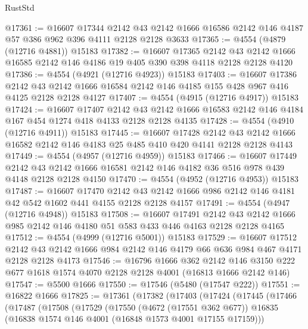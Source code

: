 \begin{lexlean}{RustStd}
\begin{coremodule}
@17361 := @16607
    @17344
    @2142
    @43
    @2142
    @1666
    @16586
    @2142
    @146
    @4187
    @57
    @386
    @962
    @396
    @4111
    @2128
    @2128
    @3633
@17365 := @4554 (@4879 (@12716 @4881)) @15183
@17382 := @16607
    @17365
    @2142
    @43
    @2142
    @1666
    @16585
    @2142
    @146
    @4186
    @19
    @405
    @390
    @398
    @4118
    @2128
    @2128
    @4120
@17386 := @4554 (@4921 (@12716 @4923)) @15183
@17403 := @16607
    @17386
    @2142
    @43
    @2142
    @1666
    @16584
    @2142
    @146
    @4185
    @155
    @428
    @967
    @416
    @4125
    @2128
    @2128
    @4127
@17407 := @4554 (@4915 (@12716 @4917)) @15183
@17424 := @16607
    @17407
    @2142
    @43
    @2142
    @1666
    @16583
    @2142
    @146
    @4184
    @167
    @454
    @1274
    @418
    @4133
    @2128
    @2128
    @4135
@17428 := @4554 (@4910 (@12716 @4911)) @15183
@17445 := @16607
    @17428
    @2142
    @43
    @2142
    @1666
    @16582
    @2142
    @146
    @4183
    @25
    @485
    @410
    @420
    @4141
    @2128
    @2128
    @4143
@17449 := @4554 (@4957 (@12716 @4959)) @15183
@17466 := @16607
    @17449
    @2142
    @43
    @2142
    @1666
    @16581
    @2142
    @146
    @4182
    @36
    @516
    @978
    @439
    @4148
    @2128
    @2128
    @4150
@17470 := @4554 (@4952 (@12716 @4953)) @15183
@17487 := @16607
    @17470
    @2142
    @43
    @2142
    @1666
    @986
    @2142
    @146
    @4181
    @42
    @542
    @1602
    @441
    @4155
    @2128
    @2128
    @4157
@17491 := @4554 (@4947 (@12716 @4948)) @15183
@17508 := @16607
    @17491
    @2142
    @43
    @2142
    @1666
    @985
    @2142
    @146
    @4180
    @51
    @583
    @433
    @446
    @4163
    @2128
    @2128
    @4165
@17512 := @4554 (@4999 (@12716 @5001)) @15183
@17529 := @16607
    @17512
    @2142
    @43
    @2142
    @1666
    @984
    @2142
    @146
    @4179
    @66
    @636
    @984
    @467
    @4171
    @2128
    @2128
    @4173
@17546 := @16796
    @1666
    @362
    @2142
    @146
    @3150
    @222
    @677
    @1618
    @1574
    @4070
    @2128
    @2128
    @4001
    (@16813 @1666 @2142 @146)
@17547 := @5500 @1666
@17550 := @17546 (@5480 (@17547 @222))
@17551 := @16822 @1666
@17825 := @17361
    (@17382
      (@17403
        (@17424
          (@17445
            (@17466
              (@17487
                (@17508
                  (@17529
                    (@17550
                      (@4672 (@17551 @362 @677))
                      @16835
                      (@16838 @1574 @146 @4001 (@16848 @1573 @4001 @17155 @17159)))

\end{coremodule}
\end{lexlean}
